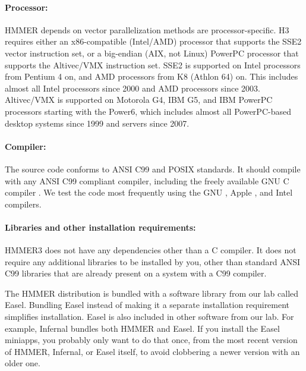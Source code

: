 \paragraph{Processor:} HMMER depends on vector parallelization methods
are processor-specific. H3 requires either an x86-compatible
(Intel/AMD) processor that supports the SSE2 vector instruction set,
or a big-endian (AIX, not Linux) PowerPC processor that supports the
Altivec/VMX instruction set. SSE2 is supported on Intel processors
from Pentium 4 on, and AMD processors from K8 (Athlon 64) on. This
includes almost all Intel processors since 2000 and AMD processors
since 2003. Altivec/VMX is supported on Motorola G4, IBM G5, and IBM
PowerPC processors starting with the Power6, which includes almost all
PowerPC-based desktop systems since 1999 and servers since
2007.


\paragraph{Compiler:} The source code conforms to ANSI
C99 and POSIX standards. It should compile with any ANSI C99 compliant
compiler, including the freely available GNU C compiler .
We test the code most frequently using the GNU , Apple
, and Intel  compilers.


\paragraph{Libraries and other installation requirements:}
HMMER3 does not have any dependencies other than a C compiler.  It
does not require any additional libraries to be installed by you,
other than standard ANSI C99 libraries that are already present on a
system with a C99 compiler.

The HMMER distribution is bundled with a software library from our lab
called Easel.
Bundling Easel instead of making it a separate installation
requirement simplifies installation. Easel is also included in other
software from our lab. For example,
Infernal
bundles both HMMER and Easel. If you install the Easel miniapps, you
probably only want to do that once, from the most recent version of
HMMER, Infernal, or Easel itself, to avoid clobbering a newer version
with an older one.

